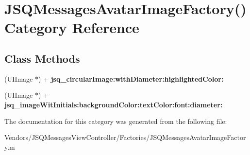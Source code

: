 \hypertarget{category_j_s_q_messages_avatar_image_factory_07_08}{}\section{J\+S\+Q\+Messages\+Avatar\+Image\+Factory() Category Reference}
\label{category_j_s_q_messages_avatar_image_factory_07_08}
\subsection*{Class Methods}
\begin{DoxyCompactItemize}
\item 
\hypertarget{category_j_s_q_messages_avatar_image_factory_07_08_a43f36447d7c346cec495c9351945e6f0}{}(U\+I\+Image $\ast$) + {\bfseries jsq\+\_\+circular\+Image\+:with\+Diameter\+:highlighted\+Color\+:}\label{category_j_s_q_messages_avatar_image_factory_07_08_a43f36447d7c346cec495c9351945e6f0}

\item 
\hypertarget{category_j_s_q_messages_avatar_image_factory_07_08_a8f9035d3c6ce4f2ce5fddd56986cc834}{}(U\+I\+Image $\ast$) + {\bfseries jsq\+\_\+image\+Wit\+Initials\+:background\+Color\+:text\+Color\+:font\+:diameter\+:}\label{category_j_s_q_messages_avatar_image_factory_07_08_a8f9035d3c6ce4f2ce5fddd56986cc834}

\end{DoxyCompactItemize}


The documentation for this category was generated from the following file\+:\begin{DoxyCompactItemize}
\item 
Vendors/\+J\+S\+Q\+Messages\+View\+Controller/\+Factories/J\+S\+Q\+Messages\+Avatar\+Image\+Factory.\+m\end{DoxyCompactItemize}

